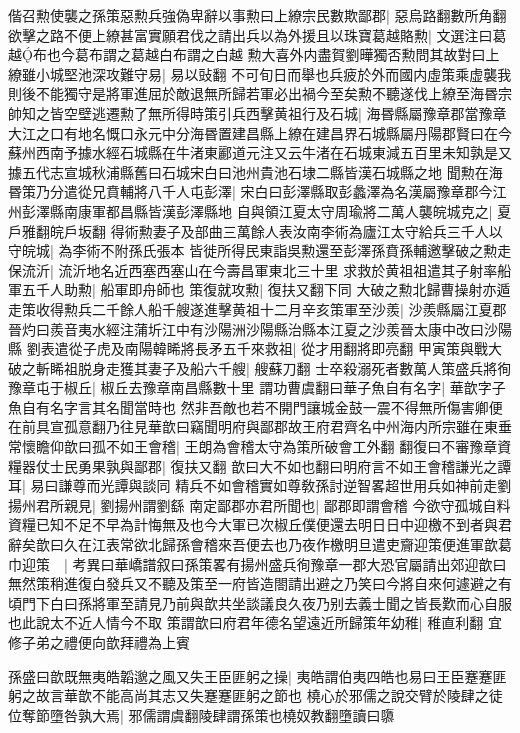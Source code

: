 偕召勲使襲之孫策惡勲兵強偽卑辭以事勲曰上繚宗民數欺鄙郡|{
	惡烏路翻數所角翻}
欲擊之路不便上繚甚富實願君伐之請出兵以為外援且以珠寶葛越賂勲|{
	文選注曰葛越布也今葛布謂之葛越白布謂之白越}
勲大喜外内盡賀劉曄獨否勲問其故對曰上繚雖小城堅池深攻難守易|{
	易以䜴翻}
不可旬日而舉也兵疲於外而國内虛策乘虚襲我則後不能獨守是將軍進屈於敵退無所歸若軍必出禍今至矣勲不聽遂伐上繚至海昬宗帥知之皆空壁逃遷勲了無所得時策引兵西擊黄祖行及石城|{
	海昬縣屬豫章郡當豫章大江之口有地名慨口永元中分海昬置建昌縣上繚在建昌界石城縣屬丹陽郡賢曰在今蘇州西南予據水經石城縣在牛渚東酈道元注又云牛渚在石城東減五百里未知孰是又據五代志宣城秋浦縣舊曰石城宋白曰池州貴池石埭二縣皆漢石城縣之地}
聞勲在海昬策乃分遣從兄賁輔將八千人屯彭澤|{
	宋白曰彭澤縣取彭蠡澤為名漢屬豫章郡今江州彭澤縣南康軍都昌縣皆漢彭澤縣地}
自與領江夏太守周瑜將二萬人襲皖城克之|{
	夏戶雅翻皖戶坂翻}
得術勲妻子及部曲三萬餘人表汝南李術為廬江太守給兵三千人以守皖城|{
	為李術不附孫氏張本}
皆徙所得民東詣吳勲還至彭澤孫賁孫輔邀擊破之勲走保流沂|{
	流沂地名近西塞西塞山在今壽昌軍東北三十里}
求救於黄祖祖遣其子射率船軍五千人助勲|{
	船軍即舟師也}
策復就攻勲|{
	復扶又翻下同}
大破之勲北歸曹操射亦遁走策收得勲兵二千餘人船千艘遂進擊黄祖十二月辛亥策軍至沙羨|{
	沙羨縣屬江夏郡晉灼曰羨音夷水經注蒲圻江中有沙陽洲沙陽縣治縣本江夏之沙羨晉太康中改曰沙陽縣}
劉表遣從子虎及南陽韓睎將長矛五千來救祖|{
	從才用翻將即亮翻}
甲寅策與戰大破之斬睎祖脱身走獲其妻子及船六千艘|{
	艘蘇刀翻}
士卒殺溺死者數萬人策盛兵將徇豫章屯于椒丘|{
	椒丘去豫章南昌縣數十里}
謂功曹虞翻曰華子魚自有名字|{
	華歆字子魚自有名字言其名聞當時也}
然非吾敵也若不開門讓城金鼓一震不得無所傷害卿便在前具宣孤意翻乃往見華歆曰竊聞明府與鄙郡故王府君齊名中州海内所宗雖在東垂常懷瞻仰歆曰孤不如王會稽|{
	王朗為會稽太守為策所破會工外翻}
翻復曰不審豫章資糧器仗士民勇果孰與鄙郡|{
	復扶又翻}
歆曰大不如也翻曰明府言不如王會稽謙光之譚耳|{
	易曰謙尊而光譚與談同}
精兵不如會稽實如尊敎孫討逆智畧超世用兵如神前走劉揚州君所親見|{
	劉揚州謂劉繇}
南定鄙郡亦君所聞也|{
	鄙郡即謂會稽}
今欲守孤城自料資糧已知不足不早為計悔無及也今大軍已次椒丘僕便還去明日日中迎檄不到者與君辭矣歆曰久在江表常欲北歸孫會稽來吾便去也乃夜作檄明旦遣吏齎迎策便進軍歆葛巾迎策　|{
	考異曰華嶠譜叙曰孫策畧有揚州盛兵徇豫章一郡大恐官屬請出郊迎歆曰無然策稍進復白發兵又不聽及策至一府皆造閤請出避之乃笑曰今將自來何遽避之有頃門下白曰孫將軍至請見乃前與歆共坐談議良久夜乃别去義士聞之皆長歎而心自服也此說太不近人情今不取}
策謂歆曰府君年德名望遠近所歸策年幼稚|{
	稚直利翻}
宜修子弟之禮便向歆拜禮為上賓

孫盛曰歆既無夷皓韜邈之風又失王臣匪躬之操|{
	夷皓謂伯夷四皓也易曰王臣蹇蹇匪躬之故言華歆不能高尚其志又失蹇蹇匪躬之節也}
橈心於邪儒之說交臂於陵肆之徒位奪節墮咎孰大焉|{
	邪儒謂虞翻陵肆謂孫策也橈奴教翻墮讀曰隳}


